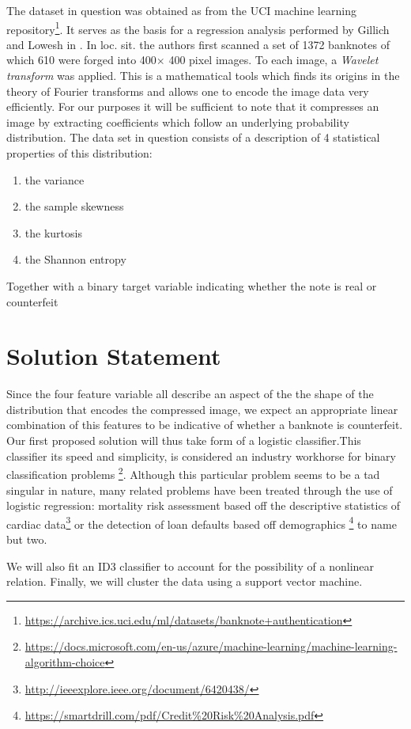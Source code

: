 \documentclass[12pt]{article}
\theoremstyle{plain} \numberwithin{equation}{section}
\theoremstyle{definition}
\begin{document}
The dataset in question was obtained as from the UCI machine learning repository\footnote{\url{https://archive.ics.uci.edu/ml/datasets/banknote+authentication}}. It serves as the basis for a regression analysis performed by Gillich and Lowesh in \cite{BNA}. In loc. sit. the authors first scanned a set of 1372 banknotes of which 610  were forged into 400$\times$ 400 pixel images. To each image, a \emph{Wavelet transform} was applied. This is a mathematical tools which finds its origins in the theory of Fourier transforms and allows one to encode the image data very efficiently. For our purposes it will be sufficient to note that it compresses an image by extracting coefficients which follow an underlying  probability distribution. The data set in question consists of a description of 4 statistical properties of this distribution:
\begin{enumerate}
\item the variance
\item the  sample skewness
\item the kurtosis	
\item the Shannon entropy
\end{enumerate}
Together with a binary target variable indicating whether the note is real or counterfeit

\section{Solution Statement}
Since the four feature variable all describe an aspect of the the shape of the distribution that encodes the compressed image, we expect an appropriate linear combination of this features to be indicative of whether a banknote is counterfeit. Our first proposed solution will thus take form of a logistic classifier.This classifier its speed and simplicity, is considered an industry workhorse for binary classification problems \footnote{\url{https://docs.microsoft.com/en-us/azure/machine-learning/machine-learning-algorithm-choice}}. Although this particular problem seems to be a tad singular in nature, many related problems have been treated through the use of logistic regression: mortality risk assessment based off the descriptive statistics of cardiac data\footnote{\url{http://ieeexplore.ieee.org/document/6420438/}} or the detection of loan defaults based off demographics \footnote{\url{https://smartdrill.com/pdf/Credit\%20Risk\%20Analysis.pdf}} to name but two.

 We will also fit an ID3 classifier to account for the possibility of a nonlinear relation. Finally, we will cluster the data using a support vector machine.
\end{document}
